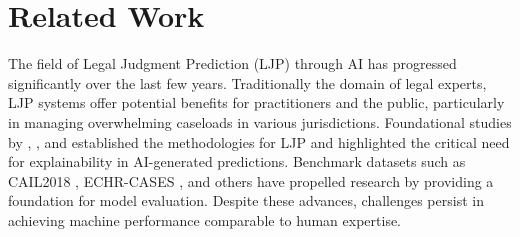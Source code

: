 \section{Related Work}

The field of Legal Judgment Prediction (LJP) through AI has progressed significantly over the last few years. Traditionally the domain of legal experts, LJP systems offer potential benefits for practitioners and the public, particularly in managing overwhelming caseloads in various jurisdictions.
%
Foundational studies by \cite{aletras2016predicting}, \cite{chalkidis2019neural}, and \cite{feng2021recommending} established the methodologies for LJP and highlighted the critical need for explainability in AI-generated predictions. Benchmark datasets such as CAIL2018 \cite{xiao2018cail2018, zhong-etal-2020-nlp}, ECHR-CASES \cite{chalkidis2019neural, aletras2016predicting, medvedeva2020using}, and others have propelled research by providing a foundation for model evaluation. Despite these advances, challenges persist in achieving machine performance comparable to human expertise.



  

